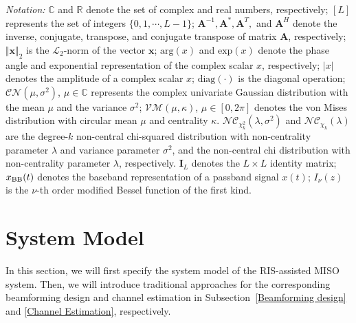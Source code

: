\documentclass[12pt,draftclsnofoot,journal,onecolumn]{IEEEtran}
\theoremstyle{nonumberplain}
\def \VM {\mathcal{VM}}
\def \nc {\mathcal{NC}}
\begin{document}
\textit{Notation:} $\mathbb C$ and $\mathbb R$ denote the set of complex and real numbers, respectively;
$[L]$ represents the set of integers $\{0,1,\cdots,L-1\}$;
$\bm A^{-1}, \bm A^*,\bm A^T,$ and $\bm A^H$ denote the inverse, conjugate, transpose, and conjugate transpose of matrix $\bm A$, respectively; 
$\Vert \bm x\Vert_{2}$ is the $\mathcal{L}_{2}$-norm of the vector $\bm x$; 
$\text{arg}(x)$ and $\text{exp}(x)$ denote the phase angle and exponential representation of the complex scalar $x$, respectively;
$\vert x\vert$ denotes the amplitude
of a complex scalar $x$; 
$\text{diag}(\cdot )$ is the diagonal operation;
$\mathcal{CN}\left(\mu, \sigma^2 \right)$, $\mu\in \mathbb C$ represents the complex univariate Gaussian distribution with the mean $\mu$ and the variance $\sigma^2$;
$\VM(\mu, \kappa)$, $\mu\in [0,2\pi]$ denotes the von Mises distribution with circular mean $\mu$ and centrality $\kappa$.
$\nc_{\chi_k^2}(\lambda, \sigma^2)$ and $\nc_{\chi_k}(\lambda)$ are the degree-$k$ non-central chi-squared distribution with  non-centrality parameter $\lambda$ and variance parameter $\sigma^2$, and the non-central chi distribution with non-centrality parameter $\lambda$, respectively.   
$\bm I_{L}$ denotes the $L\times L$ identity matrix;
$x_{\rm BB}(t)$ denotes the baseband representation of a passband signal $x(t)$;
$I_\nu(z)$ is the $\nu$-th order modified Bessel function of the first kind. 


\section{System Model}  \label{System Model}
    In this section, we will first specify the system model of the \ac{RIS}-assisted \ac{MISO} system.
    Then, we will introduce traditional approaches for the corresponding beamforming design and channel estimation in Subsection~\ref{Beamforming design} and \ref{Channel Estimation}, respectively.
\end{document}
